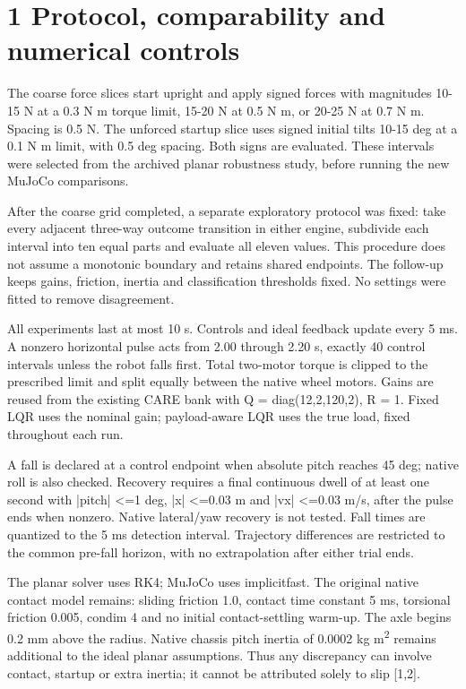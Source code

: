 \documentclass[11pt,a4paper]{article}
\begin{document}
\clearpage
\section*{1 Protocol, comparability and numerical controls}
The coarse force slices start upright and apply signed forces with magnitudes 10-15 N at a 0.3 N m torque limit, 15-20 N at 0.5 N m, or 20-25 N at 0.7 N m. Spacing is 0.5 N. The unforced startup slice uses signed initial tilts 10-15 deg at a 0.1 N m limit, with 0.5 deg spacing. Both signs are evaluated. These intervals were selected from the archived planar robustness study, before running the new MuJoCo comparisons.

After the coarse grid completed, a separate exploratory protocol was fixed: take every adjacent three-way outcome transition in either engine, subdivide each interval into ten equal parts and evaluate all eleven values. This procedure does not assume a monotonic boundary and retains shared endpoints. The follow-up keeps gains, friction, inertia and classification thresholds fixed. No settings were fitted to remove disagreement.

All experiments last at most 10 s. Controls and ideal feedback update every 5 ms. A nonzero horizontal pulse acts from 2.00 through 2.20 s, exactly 40 control intervals unless the robot falls first. Total two-motor torque is clipped to the prescribed limit and split equally between the native wheel motors. Gains are reused from the existing CARE bank with Q = diag(12,2,120,2), R = 1. Fixed LQR uses the nominal gain; payload-aware LQR uses the true load, fixed throughout each run.

A fall is declared at a control endpoint when absolute pitch reaches 45 deg; native roll is also checked. Recovery requires a final continuous dwell of at least one second with |pitch| <=1 deg, |x| <=0.03 m and |vx| <=0.03 m/s, after the pulse ends when nonzero. Native lateral/yaw recovery is not tested. Fall times are quantized to the 5 ms detection interval. Trajectory differences are restricted to the common pre-fall horizon, with no extrapolation after either trial ends.

The planar solver uses RK4; MuJoCo uses implicitfast. The original native contact model remains: sliding friction 1.0, contact time constant 5 ms, torsional friction 0.005, condim 4 and no initial contact-settling warm-up. The axle begins 0.2 mm above the radius. Native chassis pitch inertia of 0.0002 kg m\textsuperscript{2} remains additional to the ideal planar assumptions. Thus any discrepancy can involve contact, startup or extra inertia; it cannot be attributed solely to slip [1,2].
\end{document}
